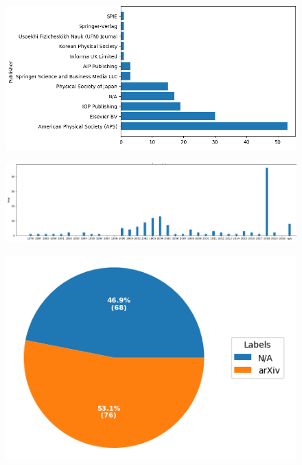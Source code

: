 \documentclass[a4paper,10pt]{article}
\begin{document}
\begin{figure}[h]
    \centering
    \includegraphics[width=\linewidth]{paper-by-publishers}
    \label{fig:keyword-top10-body}
\end{figure}

\begin{figure}[h]
    \centering
    \includegraphics[width=\linewidth]{supermat-distribution-by-year}
    \label{fig:keyword-top10-body}
\end{figure}

\begin{figure}[h]
    \centering
    \includegraphics[width=\linewidth]{pie-arxiv-papers.png}
    \label{fig:keyword-top10-body}
\end{figure}
\end{document}
